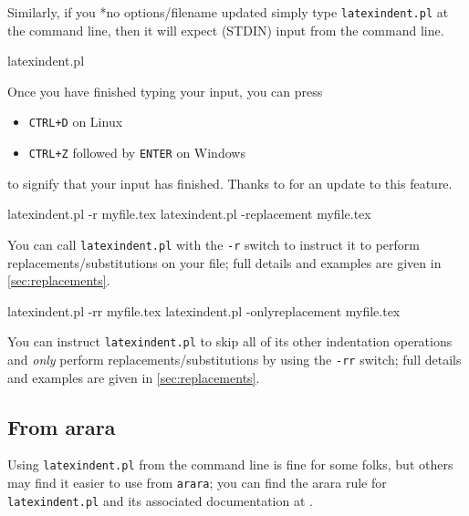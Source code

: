 	Similarly, if you%
	*{no options/filename updated} simply type
	\texttt{latexindent.pl} at the command line, then it will expect (STDIN) input from the
	command line.
	\begin{commandshell}
latexindent.pl
      \end{commandshell}

	Once you have finished typing your input, you can press
	\begin{itemize}
		\item \texttt{CTRL+D} on Linux
		\item \texttt{CTRL+Z} followed by \texttt{ENTER} on Windows
	\end{itemize}
	to signify that your input has finished. Thanks to \cite{xu-cheng} for an update
	to this feature.
	\begin{commandshell}
latexindent.pl -r myfile.tex
latexindent.pl -replacement myfile.tex
      \end{commandshell}
	You can%
	 call
	\texttt{latexindent.pl} with the \texttt{-r} switch to instruct it to perform
	replacements/substitutions on your file; full details and examples are given in
	\vref{sec:replacements}.

	\begin{commandshell}
latexindent.pl -rr myfile.tex
latexindent.pl -onlyreplacement myfile.tex
      \end{commandshell}
	You can%
	 instruct
	\texttt{latexindent.pl} to skip all of its other indentation operations and
	\emph{only} perform replacements/substitutions by using the
	\texttt{-rr} switch; full details and examples are given in
	\vref{sec:replacements}.

\subsection{From arara}\label{sec:arara}
	Using \texttt{latexindent.pl} from the command line is fine for some folks, but others
	may find it easier to use from \texttt{arara}; you can find the arara rule for
	\texttt{latexindent.pl} and its associated documentation at \cite{paulo}.
